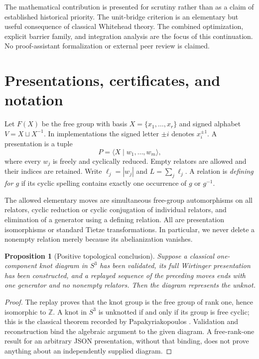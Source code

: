 \documentclass[11pt,letterpaper]{article}
\newtheorem{proposition}[theorem]{Proposition}
\theoremstyle{definition}\newtheorem{definition}[theorem]{Definition}
\newcommand{\Z}{\mathbb Z}
\newcommand{\set}[1]{\{#1\}}
\begin{document}
The mathematical contribution is presented for scrutiny rather than as a claim of established historical priority. The unit-bridge criterion is an elementary but useful consequence of classical Whitehead theory. The combined optimization, explicit barrier family, and integration analysis are the focus of this continuation. No proof-assistant formalization or external peer review is claimed.

\section{Presentations, certificates, and notation}\label{sec:notation}
Let $F(X)$ be the free group with basis $X=\set{x_1,\ldots,x_r}$ and signed alphabet
$V=X\sqcup X^{-1}$. In implementations the signed letter $\pm i$ denotes $x_i^{\pm1}$. A presentation is a tuple
\[
 P=\langle X\mid w_1,\ldots,w_m\rangle,
\]
where every $w_j$ is freely and cyclically reduced. Empty relators are allowed and their indices are retained. Write $\ell_j=|w_j|$ and $L=\sum_j\ell_j$. A relation is \emph{defining for $g$} if its cyclic spelling contains exactly one occurrence of $g$ or $g^{-1}$.

The allowed elementary moves are simultaneous free-group automorphisms on all relators, cyclic reduction or cyclic conjugation of individual relators, and elimination of a generator using a defining relation. All are presentation isomorphisms or standard Tietze transformations. In particular, we never delete a nonempty relation merely because its abelianization vanishes.

\begin{proposition}[Positive topological conclusion]\label{prop:topology}
Suppose a classical one-component knot diagram in $S^3$ has been validated, its full Wirtinger presentation has been constructed, and a replayed sequence of the preceding moves ends with one generator and no nonempty relators. Then the diagram represents the unknot.
\end{proposition}
\begin{proof}
The replay proves that the knot group is the free group of rank one, hence isomorphic to $\Z$. A knot in $S^3$ is unknotted if and only if its group is free cyclic; this is the classical theorem recorded by Papakyriakopoulos \cite[Theorem 3(i)]{papa}. Validation and reconstruction bind the algebraic argument to the given diagram. A free-rank-one result for an arbitrary JSON presentation, without that binding, does not prove anything about an independently supplied diagram.
\end{proof}
\end{document}
